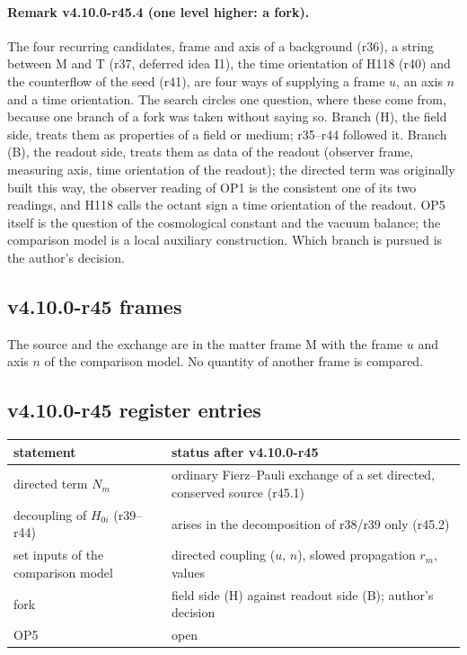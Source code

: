 \paragraph{Remark v4.10.0-r45.4 (one level higher: a fork).}
The four recurring candidates, frame and axis of a background (r36), a string between M and T (r37, deferred idea I1), the time orientation of
H118 (r40) and the counterflow of the seed (r41), are four ways of supplying a frame \(u\), an axis \(n\) and a time orientation.  The search circles one
question, where these come from, because one branch of a fork was taken without saying so.  Branch (H), the field side, treats them as properties
of a field or medium; r35--r44 followed it.  Branch (B), the readout side, treats them as data of the readout (observer frame, measuring axis, time
orientation of the readout); the directed term was originally built this way, the observer reading of OP1 is the consistent one of its two
readings, and H118 calls the octant sign a time orientation of the readout.  OP5 itself is the question of the cosmological constant and the
vacuum balance; the comparison model is a local auxiliary construction.  Which branch is pursued is the author's decision.

\subsection*{v4.10.0-r45 frames}
\label{subsec:v4100-r45-frames}

The source and the exchange are in the matter frame M with the frame \(u\) and axis \(n\) of the comparison model.  No quantity of another frame is compared.

\subsection*{v4.10.0-r45 register entries}
\label{subsec:v4100-r45-register}

\begin{center}
\small
\begin{tabular}{@{}>{\raggedright\arraybackslash}p{}>{\raggedright\arraybackslash}p{}@{}}
\toprule
statement & status after v4.10.0-r45\\
\midrule
directed term \(N_m\) & ordinary Fierz--Pauli exchange of a set directed, conserved source (r45.1)\\
decoupling of \(H_{0i}\) (r39--r44) & arises in the decomposition of r38/r39 only (r45.2)\\
set inputs of the comparison model & directed coupling (\(u\), \(n\)), slowed propagation \(r_m\), values\\
fork & field side (H) against readout side (B); author's decision\\
OP5 & open\\
\bottomrule
\end{tabular}
\end{center}


